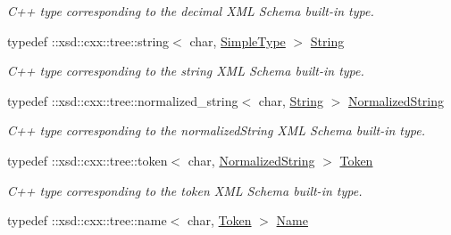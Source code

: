 \begin{DoxyCompactItemize}
\begin{DoxyCompactList}\small\item\em C++ type corresponding to the decimal XML Schema built-\/in type. \item\end{DoxyCompactList}\item 
\hypertarget{namespacexml__schema_af6757b5701ccc893f3b551bd70e0c94d}{
typedef ::xsd::cxx::tree::string$<$ char, \hyperlink{namespacexml__schema_a1171be9b6e593e49b895a46671f5dc5f}{SimpleType} $>$ \hyperlink{namespacexml__schema_af6757b5701ccc893f3b551bd70e0c94d}{String}}
\label{namespacexml__schema_af6757b5701ccc893f3b551bd70e0c94d}

\begin{DoxyCompactList}\small\item\em C++ type corresponding to the string XML Schema built-\/in type. \item\end{DoxyCompactList}\item 
\hypertarget{namespacexml__schema_ab4f1d744ea5be78260b24e88a4e395ee}{
typedef ::xsd::cxx::tree::normalized\_\-string$<$ char, \hyperlink{namespacexml__schema_af6757b5701ccc893f3b551bd70e0c94d}{String} $>$ \hyperlink{namespacexml__schema_ab4f1d744ea5be78260b24e88a4e395ee}{NormalizedString}}
\label{namespacexml__schema_ab4f1d744ea5be78260b24e88a4e395ee}

\begin{DoxyCompactList}\small\item\em C++ type corresponding to the normalizedString XML Schema built-\/in type. \item\end{DoxyCompactList}\item 
\hypertarget{namespacexml__schema_a6c5a46363a79f52c8f09edc7885e259c}{
typedef ::xsd::cxx::tree::token$<$ char, \hyperlink{namespacexml__schema_ab4f1d744ea5be78260b24e88a4e395ee}{NormalizedString} $>$ \hyperlink{namespacexml__schema_a6c5a46363a79f52c8f09edc7885e259c}{Token}}
\label{namespacexml__schema_a6c5a46363a79f52c8f09edc7885e259c}

\begin{DoxyCompactList}\small\item\em C++ type corresponding to the token XML Schema built-\/in type. \item\end{DoxyCompactList}\item 
\hypertarget{namespacexml__schema_af4febacaa19a36f5a1caab58e620f6d5}{
typedef ::xsd::cxx::tree::name$<$ char, \hyperlink{namespacexml__schema_a6c5a46363a79f52c8f09edc7885e259c}{Token} $>$ \hyperlink{namespacexml__schema_af4febacaa19a36f5a1caab58e620f6d5}{Name}}
\label{namespacexml__schema_af4febacaa19a36f5a1caab58e620f6d5}


\end{DoxyCompactItemize}
